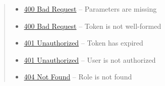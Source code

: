 \documentclass[letterpaper,10pt,english]{sphinxmanual}
\begin{document}
\begin{fulllineitems}
\begin{quote}
\begin{description}
\begin{itemize}
\item {} 
\href{http://www.w3.org/Protocols/rfc2616/rfc2616-sec10.html\#sec10.4.1}{400 Bad Request} -- Parameters are missing

\item {} 
\href{http://www.w3.org/Protocols/rfc2616/rfc2616-sec10.html\#sec10.4.1}{400 Bad Request} -- Token is not well-formed

\item {} 
\href{http://www.w3.org/Protocols/rfc2616/rfc2616-sec10.html\#sec10.4.2}{401 Unauthorized} -- Token has expired

\item {} 
\href{http://www.w3.org/Protocols/rfc2616/rfc2616-sec10.html\#sec10.4.2}{401 Unauthorized} -- User is not authorized

\item {} 
\href{http://www.w3.org/Protocols/rfc2616/rfc2616-sec10.html\#sec10.4.5}{404 Not Found} -- Role is not found

\end{itemize}

\end{description}\end{quote}

\end{fulllineitems}
\end{document}
